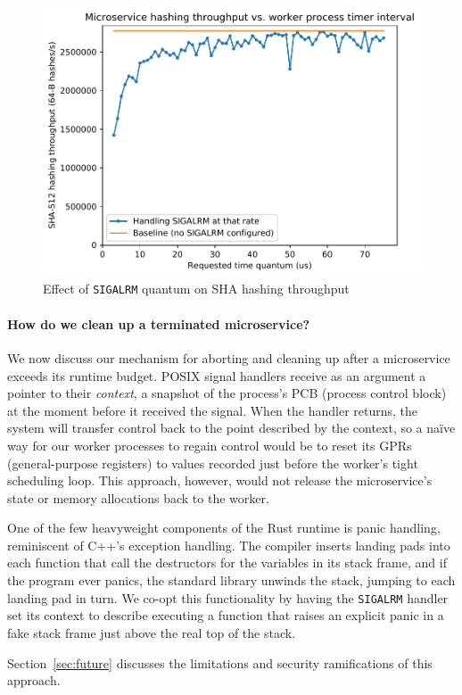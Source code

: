 \begin{figure}
\includegraphics[width=\columnwidth]{figs/2018-02-02-evaluation_quantum-hasher_throughput-throughput}
\caption{Effect of \texttt{SIGALRM} quantum on SHA hashing throughput}
\label{fig:hashtput}
\end{figure}

\paragraph{How do we clean up a terminated microservice?}
We now discuss our mechanism for aborting and cleaning up after a microservice
exceeds its runtime budget.  POSIX signal handlers receive as an argument a pointer to their
\textit{context}, a snapshot of the process's PCB (process control block) at the
moment before it received the signal.  When the handler returns, the system will
transfer control back to the point described by the context, so a naïve way for our
worker processes to regain control would be to reset its GPRs (general-purpose
registers) to values recorded just before the worker's tight scheduling loop.
This approach, however, would not release the microservice's state or memory
allocations back to the worker.

One of the few heavyweight components of the Rust runtime is panic handling,
reminiscent of C++'s exception handling.  The compiler inserts landing pads into each
function that call the destructors for the variables in its stack frame, and if the
program ever panics,
the standard library unwinds the stack, jumping to each landing pad in turn.  We
co-opt this functionality by having the \texttt{SIGALRM} handler set its context
to describe executing a function that raises an explicit panic in a fake stack frame
just above the real top of the stack.

Section~\ref{sec:future} discusses the limitations and security ramifications of
this approach.
